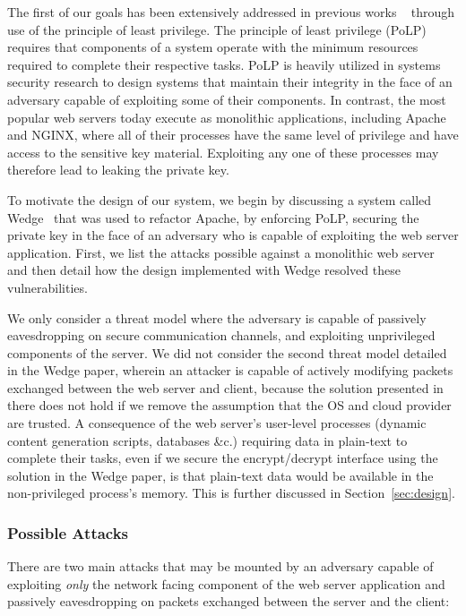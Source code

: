 \documentclass[../main.tex]{subfiles}
\begin{document}
The first of our goals has been extensively addressed in previous
works ~\cite{Bittau08, Krohn2004} through use of the principle of
least privilege. The principle of least privilege (PoLP) requires
that components of a system operate with the minimum resources
required to complete their respective tasks. PoLP is heavily utilized
in systems security research to design systems that maintain their
integrity in the face of an adversary capable of exploiting some of
their components. In contrast, the most popular web servers today
execute as monolithic applications, including Apache and NGINX, where
all of their processes have the same level of privilege and have
access to the sensitive key material. Exploiting any one of these
processes may therefore lead to leaking the private key.

To motivate the design of our system, we begin by discussing a system
called Wedge~\cite{Bittau08} that was used to refactor Apache, by
enforcing PoLP, securing the private key in the face of an adversary
who is capable of exploiting the web server application. First, we
list the attacks possible against a monolithic web server and then
detail how the design implemented with Wedge resolved these
vulnerabilities.

We only consider a threat model where the adversary is capable of
passively eavesdropping on secure communication channels, and
exploiting unprivileged components of the server. We did not consider
the second threat model detailed in the Wedge paper, wherein an
attacker is capable of actively modifying packets exchanged between
the web server and client, because the solution presented in there
does not hold if we remove the assumption that the OS and cloud
provider are trusted. A consequence of the web server's user-level
processes (dynamic content generation scripts, databases \&c.)
requiring data in plain-text to complete their tasks, even if we secure
the encrypt/decrypt interface using the solution in the Wedge paper,
is that plain-text data would be available in the non-privileged process's
memory. This is further discussed in Section~\ref{sec:design}.

\subsubsection*{Possible Attacks}

There are two main attacks that may be mounted by an adversary capable
of exploiting \textit{only} the network facing component of the web
server application and passively eavesdropping on packets exchanged
between the server and the client:
\end{document}
